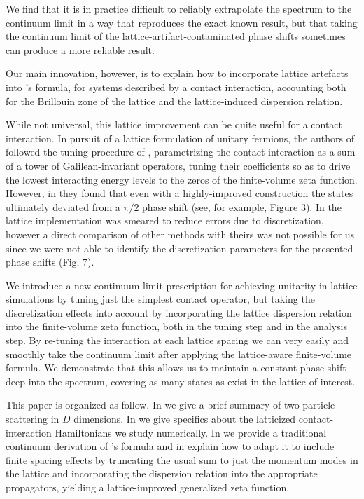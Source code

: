 We find that it is in practice difficult to reliably extrapolate the spectrum to the continuum limit in a way that reproduces the exact known result, but that taking the continuum limit of the lattice-artifact-contaminated phase shifts sometimes can produce a more reliable result.

Our main innovation, however, is to explain how to incorporate lattice artefacts into \Luscher's formula, for systems described by a contact interaction, accounting both for the Brillouin zone of the lattice and the lattice-induced dispersion relation.

While not universal, this lattice improvement can be quite useful for a contact interaction.
In pursuit of a lattice formulation of unitary fermions, the authors of  followed the tuning procedure of , parametrizing the contact interaction as a sum of a tower of Galilean-invariant operators, tuning their coefficients so as to drive the lowest interacting energy levels to the zeros of the \Luscher finite-volume zeta function.
However, in  they found that even with a highly-improved construction the states ultimately deviated from a $\pi/2$ phase shift (see, for example, Figure 3).
In  the lattice implementation was smeared to reduce errors due to discretization, however a direct comparison of other methods with theirs was not possible for us since we were not able to identify the discretization parameters for the presented phase shifts (Fig. 7).

We introduce a new continuum-limit prescription for achieving unitarity in lattice simulations by tuning just the simplest contact operator, but taking the discretization effects into account by incorporating the lattice dispersion relation into the finite-volume zeta function, both in the tuning step and in the analysis step.
By re-tuning the interaction at each lattice spacing we can very easily and smoothly take the continuum limit after applying the lattice-aware finite-volume formula.
We demonstrate that this allows us to maintain a constant phase shift deep into the spectrum, covering as many \Aoneg states as exist in the lattice of interest.

This paper is organized as follow.  In  we give a brief summary of two particle scattering in $D$ dimensions.
In  we give specifics about the latticized contact-interaction Hamiltonians we study numerically.
In  we provide a traditional continuum derivation of \Luscher's formula and in  explain how to adapt it to include finite spacing effects by truncating the usual sum to just the momentum modes in the lattice and incorporating the dispersion relation into the appropriate propagators, yielding a lattice-improved generalized \Luscher zeta function.

